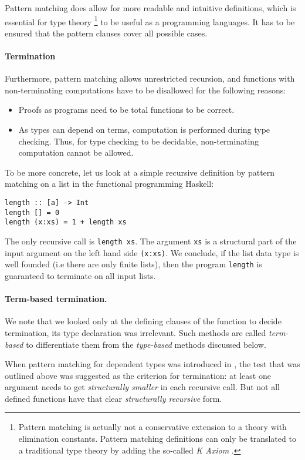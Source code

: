 Pattern matching does allow for more readable and intuitive definitions, which is essential for type theory \footnote{Pattern matching is actually not a conservative extension to a theory with elimination constants.
Pattern matching definitions can only be translated to a traditional type theory by adding the so-called \emph{K Axiom} \cite{hofmann95groupoid,GoguHMcBrCM2006}.
} to be useful as a programming languages.
It has to be ensured that the pattern clauses cover all possible cases.
\paragraph*{Termination}
Furthermore, pattern matching allows unrestricted recursion, and functions with non-terminating computations have to be disallowed for the following reasons:
\begin{itemize}
\item
Proofs as programs need to be total functions to be correct.
\item
As types can depend on terms, computation is performed during type checking.
Thus, for type checking to be decidable, non-terminating computation cannot be allowed.
\end{itemize}
To be more concrete, let us look at a simple recursive definition by pattern matching on a list in the functional programming Haskell:
\begin{verbatim}
length :: [a] -> Int
length [] = 0
length (x:xs) = 1 + length xs
\end{verbatim}
The only recursive call is \texttt{length xs}.
The argument \texttt{xs} is a structural part of the input argument on the left hand side \texttt{(x:xs)}.
We conclude, if the list data type is well founded (i.e there are only finite lists), then the program \texttt{length} is guaranteed to terminate on all input lists.

\paragraph*{Term-based termination.}
We note that we looked only at the defining clauses of the function to decide termination, its type declaration was irrelevant. Such methods are called \emph{term-based} to differentiate them from the \emph{type-based} methods discussed below.

When pattern matching for dependent types was introduced in  \cite{coquand92pattern},
the test that was outlined above was suggested as the criterion for termination:
at least one argument needs to get \emph{structurally smaller} in each recursive call.
But not all defined functions have that clear \emph{structurally recursive} form.

